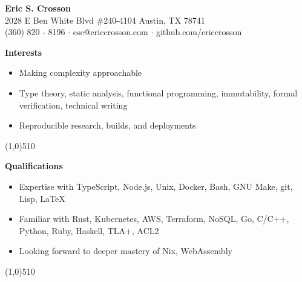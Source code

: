 \documentclass{report}
\newcommand{\cut}{\begin{center} \line(1,0){510} \end{center}}
\begin{document}
\pagestyle{empty}
\setlength\parindent{0pt}

\begin{center}
  \textbf{Eric S. Crosson} \\
  2028 E Ben White Blvd \#240-4104 Austin, TX 78741 \\
  (360) 820 - 8196 $\cdot$ esc@ericcrosson.com $\cdot$ github.com/ericcrosson
\end{center}

\textbf{Interests}
\begin{itemize}[label=$\cdot$]
\item Making complexity approachable
\item Type theory, static analysis, functional programming, immutability, formal verification, technical writing
\item Reproducible research, builds, and deployments
\end{itemize}

\cut{}

\textbf{Qualifications}
\begin{itemize}[label=$\cdot$]
\item Expertise with TypeScript, Node.js, Unix, Docker, Bash, GNU Make, git, Lisp, \LaTeX{}
\item Familiar with Rust, Kubernetes, AWS, Terraform, NoSQL, Go, C/C++, Python, Ruby, Haskell, TLA+, ACL2
\item Looking forward to deeper mastery of Nix, WebAssembly
\end{itemize}

\cut{}
\end{document}
